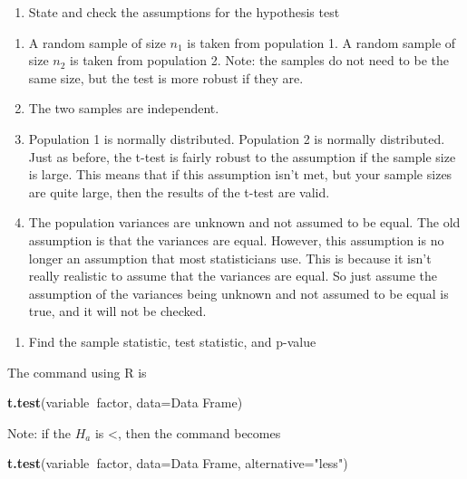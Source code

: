 \documentclass[
]{book}
\newenvironment{Shaded}{\begin{snugshade}}{\end{snugshade}}
\newcommand{\DataTypeTok}[1]{\textcolor[rgb]{0.13,0.29,0.53}{#1}}
\newcommand{\KeywordTok}[1]{\textcolor[rgb]{0.13,0.29,0.53}{\textbf{#1}}}
\newcommand{\NormalTok}[1]{#1}
\newcommand{\OperatorTok}[1]{\textcolor[rgb]{0.81,0.36,0.00}{\textbf{#1}}}
\newcommand{\StringTok}[1]{\textcolor[rgb]{0.31,0.60,0.02}{#1}}
\providecommand{\tightlist}{%
  \setlength{\itemsep}{0pt}\setlength{\parskip}{0pt}}
\begin{document}
\begin{enumerate}
\def\labelenumi{\arabic{enumi}.}
\setcounter{enumi}{2}
\tightlist
\item
  State and check the assumptions for the hypothesis test
\end{enumerate}

\begin{enumerate}
\def\labelenumi{\alph{enumi}.}
\item
  A random sample of size \(n_1\) is taken from population 1. A random sample of size \(n_2\) is taken from population 2. Note: the samples do not need to be the same size, but the test is more robust if they are.
\item
  The two samples are independent.
\item
  Population 1 is normally distributed. Population 2 is normally distributed. Just as before, the t-test is fairly robust to the assumption if the sample size is large. This means that if this assumption isn't met, but your sample sizes are quite large, then the results of the t-test are valid.
\item
  The population variances are unknown and not assumed to be equal. The old assumption is that the variances are equal. However, this assumption is no longer an assumption that most statisticians use. This is because it isn't really realistic to assume that the variances are equal. So just assume the assumption of the variances being unknown and not assumed to be equal is true, and it will not be checked.
\end{enumerate}

\begin{enumerate}
\def\labelenumi{\arabic{enumi}.}
\setcounter{enumi}{3}
\tightlist
\item
  Find the sample statistic, test statistic, and p-value
\end{enumerate}

The command using R is

\begin{Shaded}
\begin{Highlighting}[]
\KeywordTok{t.test}\NormalTok{(variable}\OperatorTok{~}\NormalTok{factor, }\DataTypeTok{data=}\NormalTok{Data Frame)}
\end{Highlighting}
\end{Shaded}

Note: if the \(H_a\) is \textless, then the command becomes

\begin{Shaded}
\begin{Highlighting}[]
\KeywordTok{t.test}\NormalTok{(variable}\OperatorTok{~}\NormalTok{factor, }\DataTypeTok{data=}\NormalTok{Data Frame, }\DataTypeTok{alternative=}\StringTok{"less"}\NormalTok{)}
\end{Highlighting}
\end{Shaded}
\end{document}
